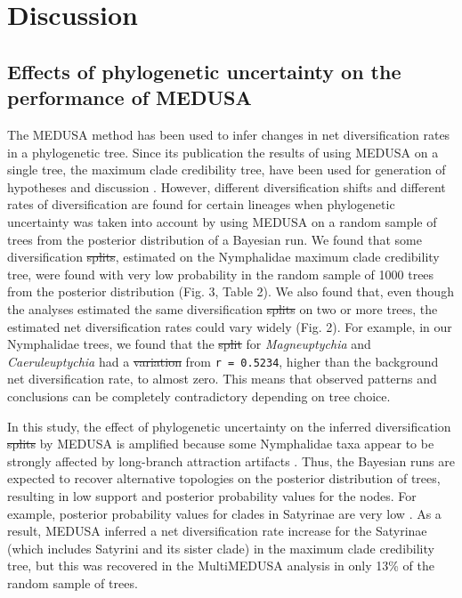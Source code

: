 \documentclass[10pt]{article}
\providecommand{\DIFaddtex}[1]{{\protect\color{blue}\uwave{#1}}} %
\providecommand{\DIFdeltex}[1]{{\protect\color{red}\sout{#1}}}                      %
\providecommand{\DIFaddbegin}{} %
\providecommand{\DIFaddend}{} %
\providecommand{\DIFdelbegin}{} %
\providecommand{\DIFdelend}{} %
\providecommand{\DIFadd}[1]{\texorpdfstring{\DIFaddtex{#1}}{#1}} %
\providecommand{\DIFdel}[1]{\texorpdfstring{\DIFdeltex{#1}}{}} %
\begin{document}
\section*{Discussion}

\subsection*{Effects of phylogenetic uncertainty on the performance of
MEDUSA}

The MEDUSA method has been used to infer changes in net diversification
rates in a phylogenetic tree. Since its publication \cite{alfaro2009} the results
of using MEDUSA on a single tree, the maximum clade credibility tree,
have been used for generation of hypotheses and discussion
\cite{heikkila2012, litman2011, ryberg2012}. However, different diversification shifts and different
rates of diversification are found for certain lineages when
phylogenetic uncertainty was taken into account by using MEDUSA on a
random sample of trees from the posterior distribution of a Bayesian
run. We found that some diversification \DIFdelbegin \DIFdel{splits}\DIFdelend \DIFaddbegin \DIFadd{shifts}\DIFaddend , estimated on the
Nymphalidae maximum clade credibility tree, were found with very low
probability in the random sample of 1000 trees from the posterior
distribution (Fig. 3, Table 2). We also found that, even though the
analyses estimated the same diversification \DIFdelbegin \DIFdel{splits }\DIFdelend \DIFaddbegin \DIFadd{shifts }\DIFaddend on two or more trees,
the estimated net diversification rates could vary widely (Fig. 2). For
example, in our Nymphalidae trees, we found that the \DIFdelbegin \DIFdel{split }\DIFdelend \DIFaddbegin \DIFadd{shift }\DIFaddend for
\emph{Magneuptychia} and \emph{Caeruleuptychia} had a \DIFdelbegin \DIFdel{variation }\DIFdelend \DIFaddbegin \DIFadd{rate }\DIFaddend from
\texttt{r = 0.5234}, higher than the background net diversification
rate, to almost zero. This means that observed patterns and conclusions
can be completely contradictory depending on tree choice.

In this study, the effect of phylogenetic uncertainty on the inferred
diversification \DIFdelbegin \DIFdel{splits }\DIFdelend \DIFaddbegin \DIFadd{shifts }\DIFaddend by MEDUSA is amplified because some Nymphalidae
taxa appear to be strongly affected by long-branch attraction artifacts
\cite{pena2011}. Thus, the Bayesian runs are expected to recover alternative
topologies on the posterior distribution of trees, resulting in low
support and posterior probability values for the nodes. For example,
posterior probability values for clades in Satyrinae are very low
\cite{wahlberg2009}. As a result, MEDUSA inferred a net diversification rate
increase for the Satyrinae (which includes Satyrini and its sister
clade) in the maximum clade credibility tree, but this was recovered in
the MultiMEDUSA analysis in only 13\% of the random sample of trees.
\end{document}
